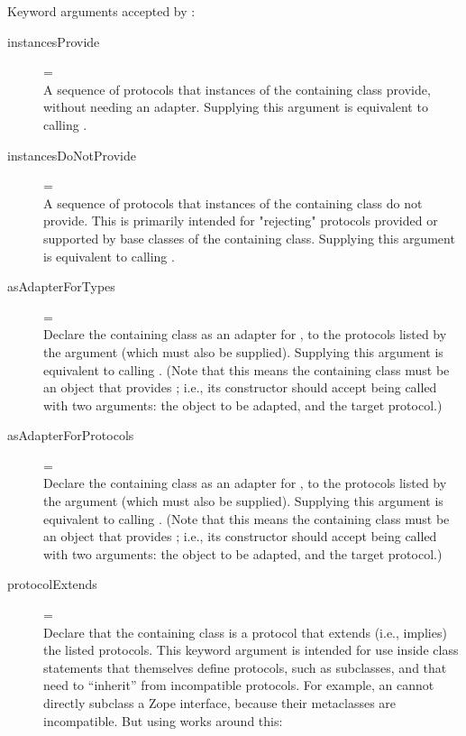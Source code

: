 \begin{verbatim%
}
\begin{verbatim%
}
\begin{verbatim%
}
\begin{verbatim%
}
Keyword arguments accepted by :

\begin{description}

\item[instancesProvide]=  \hfill \\
A sequence of protocols that instances of the containing class provide, without
needing an adapter.  Supplying this argument is equivalent to calling
.

\item[instancesDoNotProvide]=  \hfill \\
A sequence of protocols that instances of the containing class do not provide.
This is primarily intended for "rejecting" protocols provided or supported
by base classes of the containing class.  Supplying this argument is equivalent
to calling .

\item[asAdapterForTypes]=  \hfill \\
Declare the containing class as an adapter for , to the protocols
listed by the  argument (which must also be supplied).
Supplying this argument is equivalent to calling
.  (Note that this means the containing class must be an
object that provides ; i.e., its constructor should
accept being called with two arguments: the object to be adapted, and the
target protocol.)

\item[asAdapterForProtocols]=  \hfill \\
Declare the containing class as an adapter for , to the
protocols listed by the  argument (which must also be
supplied).  Supplying this argument is equivalent to calling
.  (Note that this means the containing class must be
an object that provides ; i.e., its constructor should
accept being called with two arguments: the object to be adapted, and the
target protocol.)






\item[protocolExtends]=  \hfill \\
Declare that the containing class is a protocol that extends (i.e., implies)
the listed protocols.  This keyword argument is intended for use inside class
statements that themselves define protocols, such as 
subclasses, and that need to ``inherit'' from incompatible protocols.  For
example, an  cannot directly subclass a Zope interface,
because their metaclasses are incompatible.  But using 
works around this:


\end{description}
\end{verbatim%
}
\end{verbatim%
}
\end{verbatim%
}
\end{verbatim%
}
